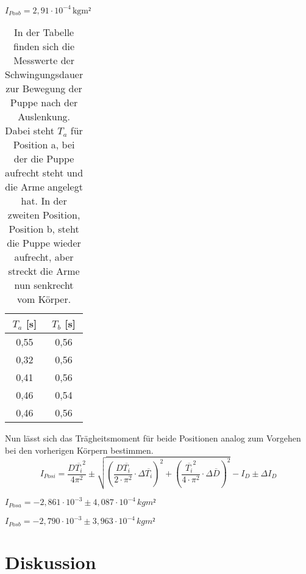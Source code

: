 \documentclass[titlepage = firstcover]{scrartcl}
\begin{document}
      $I_{Posb} = 2,91 \cdot 10^{-4} \, \text{kgm²}$
      \newpage
      \begin{table}[h]
        \centering
        \caption{In der Tabelle finden sich die Messwerte der Schwingungsdauer zur Bewegung der Puppe nach der Auslenkung. Dabei steht $T_a$ für Position a, bei der die Puppe aufrecht steht und die Arme angelegt hat. In der zweiten Position, Position b, steht die Puppe wieder aufrecht, aber streckt die Arme nun senkrecht vom Körper.}
        \label{tab:Tabelle_4}

        \begin{tabular}{c c}
          \toprule
          {$T_a$ [s]} & {$T_b$ [s]} \\
          \midrule
          0,55 & 0,56 \\
          0,32 & 0,56 \\
          0,41 & 0,56 \\ 
          0,46 & 0,54 \\
          0,46 & 0,56 \\
          \bottomrule
        \end{tabular}
      \end{table}  
      
      Nun lässt sich das Trägheitsmoment für beide Positionen analog zum Vorgehen bei den vorherigen Körpern bestimmen.
      \begin{equation}
        I_{Posi} = \frac{D\overline{T_i}^2}{4\pi^2} \pm \sqrt{(\frac{D\overline{T_i}}{2\cdot \pi^2} \cdot \Delta \overline{T_i})^2 + (\frac{\overline{T_i}^2}{4 \cdot \pi^2} \cdot \Delta \overline{D})^2} - I_D \pm \Delta I_D
      \end{equation}

      $I_{Posa} = -2,861 \cdot 10^{-3} \pm 4,087 \cdot 10^{-4} \, kgm²$ \newline

      $I_{Posb} = -2,790 \cdot 10^{-3} \pm 3,963 \cdot 10^{-4} \, kgm²$
        
      

    \section{Diskussion}
\end{document}
